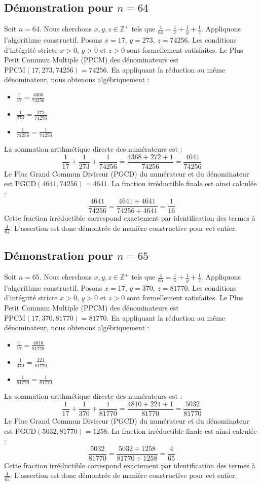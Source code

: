 \documentclass[11pt,a4paper]{article}
\begin{document}
\subsection{Démonstration pour $n = 64$}
Soit $n = 64$. Nous cherchons $x, y, z \in \mathbb{Z}^{+}$ tels que $\frac{4}{64} = \frac{1}{x} + \frac{1}{y} + \frac{1}{z}$.
Appliquons l'algorithme constructif. Posons $x = 17$, $y = 273$, $z = 74256$.
Les conditions d'intégrité stricte $x > 0$, $y > 0$ et $z > 0$ sont formellement satisfaites.
Le Plus Petit Commun Multiple (PPCM) des dénominateurs est $\text{PPCM}(17, 273, 74256) = 74256$.
En appliquant la réduction au même dénominateur, nous obtenons algébriquement :
\begin{itemize}
    \item $\frac{1}{17} = \frac{4368}{74256}$
    \item $\frac{1}{273} = \frac{272}{74256}$
    \item $\frac{1}{74256} = \frac{1}{74256}$
\end{itemize}
La sommation arithmétique directe des numérateurs est :
$$ \frac{1}{17} + \frac{1}{273} + \frac{1}{74256} = \frac{4368 + 272 + 1}{74256} = \frac{4641}{74256} $$
Le Plus Grand Commun Diviseur (PGCD) du numérateur et du dénominateur est $\text{PGCD}(4641, 74256) = 4641$.
La fraction irréductible finale est ainsi calculée :
$$ \frac{4641}{74256} = \frac{4641 \div 4641}{74256 \div 4641} = \frac{1}{16} $$
Cette fraction irréductible correspond exactement par identification des termes à $\frac{4}{64}$. L'assertion est donc démontrée de manière constructive pour cet entier.

\subsection{Démonstration pour $n = 65$}
Soit $n = 65$. Nous cherchons $x, y, z \in \mathbb{Z}^{+}$ tels que $\frac{4}{65} = \frac{1}{x} + \frac{1}{y} + \frac{1}{z}$.
Appliquons l'algorithme constructif. Posons $x = 17$, $y = 370$, $z = 81770$.
Les conditions d'intégrité stricte $x > 0$, $y > 0$ et $z > 0$ sont formellement satisfaites.
Le Plus Petit Commun Multiple (PPCM) des dénominateurs est $\text{PPCM}(17, 370, 81770) = 81770$.
En appliquant la réduction au même dénominateur, nous obtenons algébriquement :
\begin{itemize}
    \item $\frac{1}{17} = \frac{4810}{81770}$
    \item $\frac{1}{370} = \frac{221}{81770}$
    \item $\frac{1}{81770} = \frac{1}{81770}$
\end{itemize}
La sommation arithmétique directe des numérateurs est :
$$ \frac{1}{17} + \frac{1}{370} + \frac{1}{81770} = \frac{4810 + 221 + 1}{81770} = \frac{5032}{81770} $$
Le Plus Grand Commun Diviseur (PGCD) du numérateur et du dénominateur est $\text{PGCD}(5032, 81770) = 1258$.
La fraction irréductible finale est ainsi calculée :
$$ \frac{5032}{81770} = \frac{5032 \div 1258}{81770 \div 1258} = \frac{4}{65} $$
Cette fraction irréductible correspond exactement par identification des termes à $\frac{4}{65}$. L'assertion est donc démontrée de manière constructive pour cet entier.
\end{document}
